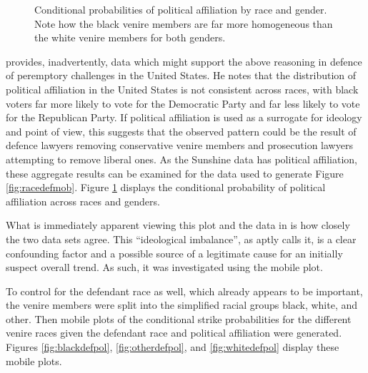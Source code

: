 \begin{figure}[h!]
  \centering
  \caption[Political Affiliation by Race and Gender (Sunshine)]
  {Conditional probabilities of political affiliation by race and gender. Note how the black venire members are far more
    homogeneous than the white venire members for both genders.} 
  \label{fig:racepolit}
\end{figure}

\cite{revesz2016} provides, inadvertently, data which might support the above reasoning in defence of peremptory challenges in the
United States. He notes that the distribution of political affiliation in the United States is not consistent across races, with
black voters far more likely to vote for the Democratic Party and far less likely to vote for the Republican Party. If political
affiliation is used as a surrogate for ideology and point of view, this suggests that the observed pattern could be the result of
defence lawyers removing conservative venire members and prosecution lawyers attempting to remove liberal ones. As the Sunshine
data has political affiliation, these aggregate results can be examined for the data used to generate Figure
\ref{fig:racedefmob}. Figure \ref{fig:racepolit} displays the conditional probability of political affiliation across races and
genders.

What is immediately apparent viewing this plot and the data in \cite{revesz2016} is how closely the two data sets agree. This
``ideological imbalance'', as \citeauthor{revesz2016} aptly calls it, is a clear confounding factor and a possible source of a
legitimate cause for an initially suspect overall trend. As such, it was investigated using the mobile plot.

To control for the defendant race as well, which already appears to be important, the venire members were split into the
simplified racial groups black, white, and other. Then mobile plots of the conditional strike probabilities for the different
venire races given the defendant race and political affiliation were generated. Figures \ref{fig:blackdefpol},
\ref{fig:otherdefpol}, and \ref{fig:whitedefpol} display these mobile plots.

